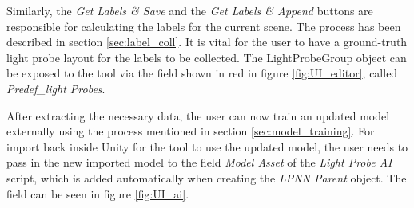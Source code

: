 Similarly, the \textit{Get Labels \& Save} and the \textit{Get Labels \& Append} buttons are responsible for calculating the labels for the current scene. The process has been described in section \ref{sec:label_coll}. It is vital for the user to have a ground-truth light probe layout for the labels to be collected. The LightProbeGroup object can be exposed to the tool via the field shown in red in figure \ref{fig:UI_editor}, called \textit{Predef\_light Probes}.

After extracting the necessary data, the user can now train an updated model externally using the process mentioned in section \ref{sec:model_training}. For import back inside Unity for the tool to use the updated model, the user needs to pass in the new imported model to the field \textit{Model Asset} of the \textit{Light Probe AI} script, which is added automatically when creating the \textit{LPNN Parent} object. The field can be seen in figure \ref{fig:UI_ai}.


